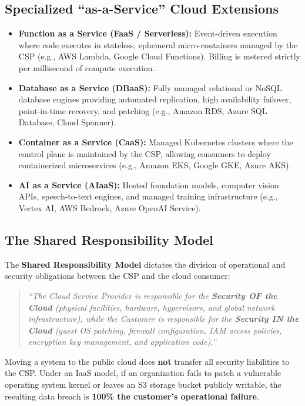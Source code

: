 \subsection{Specialized ``as-a-Service'' Cloud Extensions}
\begin{itemize}
    \item \textbf{Function as a Service (FaaS / Serverless):} Event-driven execution where code executes in stateless, ephemeral micro-containers managed by the CSP (e.g., AWS Lambda, Google Cloud Functions). Billing is metered strictly per millisecond of compute execution.
    \item \textbf{Database as a Service (DBaaS):} Fully managed relational or NoSQL database engines providing automated replication, high availability failover, point-in-time recovery, and patching (e.g., Amazon RDS, Azure SQL Database, Cloud Spanner).
    \item \textbf{Container as a Service (CaaS):} Managed Kubernetes clusters where the control plane is maintained by the CSP, allowing consumers to deploy containerized microservices (e.g., Amazon EKS, Google GKE, Azure AKS).
    \item \textbf{AI as a Service (AIaaS):} Hosted foundation models, computer vision APIs, speech-to-text engines, and managed training infrastructure (e.g., Vertex AI, AWS Bedrock, Azure OpenAI Service).
\end{itemize}

\subsection{The Shared Responsibility Model}
The \textbf{Shared Responsibility Model} dictates the division of operational and security obligations between the CSP and the cloud consumer:
\begin{quote}
\textit{``The Cloud Service Provider is responsible for the \textbf{Security OF the Cloud} (physical facilities, hardware, hypervisors, and global network infrastructure), while the Customer is responsible for the \textbf{Security IN the Cloud} (guest OS patching, firewall configuration, IAM access policies, encryption key management, and application code).''}
\end{quote}
\begin{tcolorbox}[colback=red!5!white,colframe=red!75!black,title=\textbf{Crucial Examination Axiom}]
Moving a system to the public cloud does \textbf{not} transfer all security liabilities to the CSP. Under an IaaS model, if an organization fails to patch a vulnerable operating system kernel or leaves an S3 storage bucket publicly writable, the resulting data breach is \textbf{100\% the customer's operational failure}.
\end{tcolorbox}


